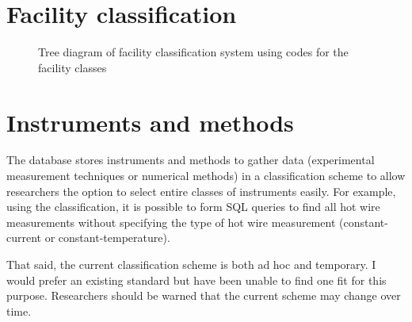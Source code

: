 \section{Facility classification}



\begin{figure}
    \centering
    
    \caption{Tree diagram of facility classification system using codes for the
    facility classes}
\end{figure}


\section{Instruments and methods}

The database stores instruments and methods to gather data (experimental
measurement techniques or numerical methods) in a classification scheme to
allow researchers the option to select entire classes of instruments easily.
For example, using the classification, it is possible to form SQL queries to
find all hot wire measurements without specifying the type of hot wire
measurement (constant-current or constant-temperature).

That said, the current classification scheme is both ad hoc and temporary.  I
would prefer an existing standard but have been unable to find one fit for this
purpose.  Researchers should be warned that the current scheme may change over
time.



